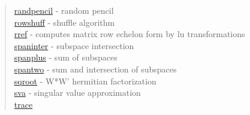 \begin{quote}
\hyperlink{randpencil}{randpencil} - {random pencil} \\  
\hyperlink{rowshuff}{rowshuff} - {shuffle algorithm} \\  
\hyperlink{rref}{rref} - {computes  matrix row echelon form by lu transformations} \\  
\hyperlink{spaninter}{spaninter} - {subspace intersection} \\  
\hyperlink{spanplus}{spanplus} - {sum of subspaces} \\  
\hyperlink{spantwo}{spantwo} - {sum and intersection of subspaces} \\  
\hyperlink{sqroot}{sqroot} - {W*W' hermitian factorization} \\  
\hyperlink{sva}{sva} - {singular value approximation} \\  
\hyperlink{trace}{trace}
\end{quote}





























